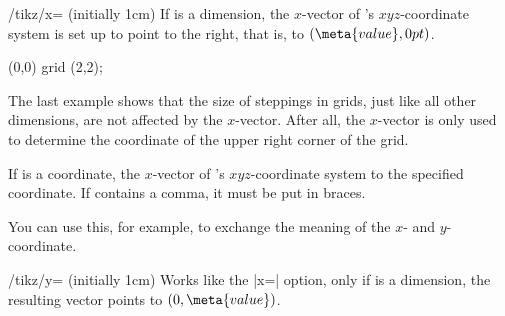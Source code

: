 \begin{key}{/tikz/x= (initially 1cm)}
    If  is a dimension, the $x$-vector of \pgfname's
    $xyz$-coordinate system is set up to point  to the right, that
    is, to $(\meta{value},0pt)$.
\begin{codeexample}[]
\end{codeexample}

\begin{codeexample}[]
\tikz \draw[x=1.5cm] (0,0) grid (2,2);
\end{codeexample}

    The last example shows that the size of steppings in grids, just like all
    other dimensions, are not affected by the $x$-vector. After all, the
    $x$-vector is only used to determine the coordinate of the upper right
    corner of the grid.

    If  is a coordinate, the $x$-vector of \pgfname's
    $xyz$-coordinate system to the specified coordinate. If 
    contains a comma, it must be put in braces.
\begin{codeexample}[]
\end{codeexample}

    You can use this, for example, to exchange the meaning of the $x$- and
    $y$-coordinate.
\begin{codeexample}[]
\end{codeexample}
\end{key}

\begin{key}{/tikz/y= (initially 1cm)}
    Works like the |x=| option, only if  is a dimension, the
    resulting vector points to $(0,\meta{value})$.
\end{key}

